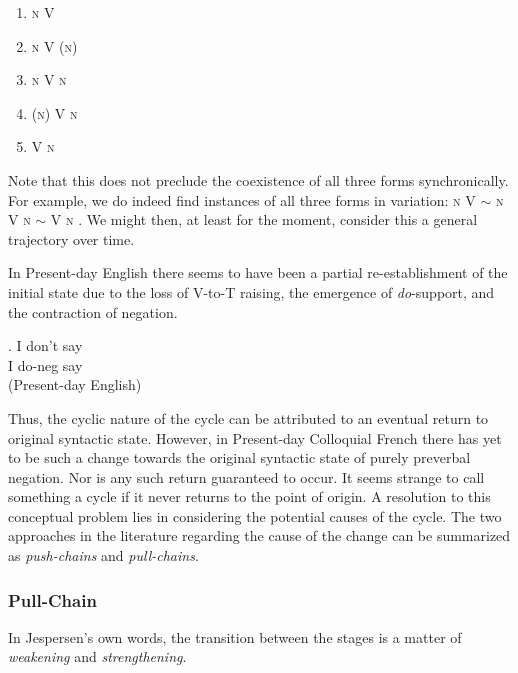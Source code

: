 \documentclass[12pt]{article}
\theoremstyle{definition} \newtheorem{definition}{Definition}
\begin{document}
\begin{center}
\begin{enumerate}
     \item \textsc{n V}
    \item \textsc{n V (n)}
    \item \textsc{n V n}
    \item \textsc{(n) V n}
    \item \textsc{ V n}
\end{enumerate}
\end{center}
Note that this does not preclude the coexistence of all three forms synchronically. For example, we do indeed find instances of all three forms in variation: \textsc{n V} $\sim$ \textsc{n V n} $\sim$ \textsc{V n} \citep{schwenter2005, schwenter2006}. We might then, at least for the moment, consider this a general trajectory over time.

In Present-day English there seems to have been a partial re-establishment of the initial state due to the loss of V-to-T raising, the emergence of \emph{do}-support, and the contraction of negation.

\exg. I don't say\\
      I do-neg say\\
      (Present-day English)

Thus, the cyclic nature of the cycle can be attributed to an eventual return to original syntactic state. However, in Present-day Colloquial French there has yet to be such a change towards the original syntactic state of purely preverbal negation. Nor is any such return guaranteed to occur. It seems strange to call something a cycle if it never returns to the point of origin. A resolution to this conceptual problem lies in considering the potential causes of the cycle. The two approaches in the literature regarding the cause of the change can be summarized as \emph{push-chains} and \emph{pull-chains}.

\subsubsection{Pull-Chain}
In Jespersen's own words, the transition between the stages is a matter of \emph{weakening} and \emph{strengthening}.
\end{document}
